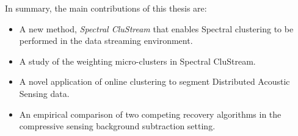 In summary, the main contributions of this thesis are:

\begin{itemize}
\item A new method, \textit{Spectral CluStream} that enables Spectral clustering to be performed in the data streaming environment.
\item A study of the weighting micro-clusters in Spectral CluStream.
  \item A novel application of online clustering to segment  Distributed Acoustic Sensing data.
   \item An empirical comparison of two competing recovery algorithms in the compressive sensing background subtraction setting.
\end{itemize}


